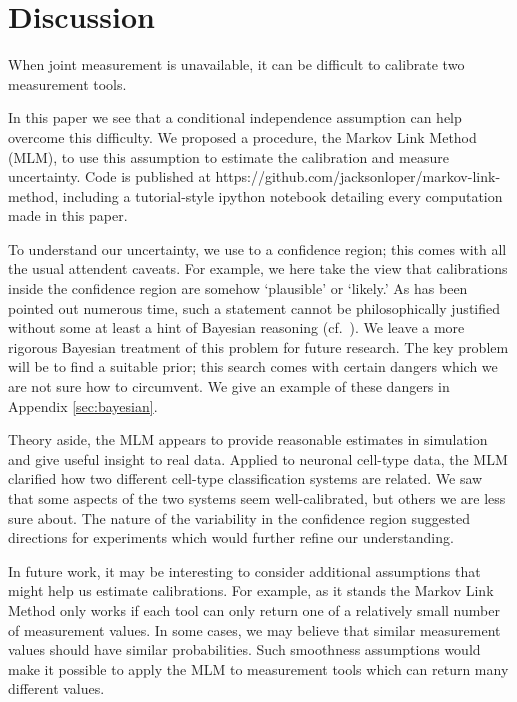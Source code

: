 %                                                    


\section{Discussion}

When joint measurement is unavailable, it can be difficult to calibrate two measurement tools.

In this paper we see that a conditional independence assumption can help overcome this difficulty.  We proposed a procedure, the Markov Link Method (MLM), to use this assumption to estimate the calibration and measure uncertainty.  Code is published at https://github.com/jacksonloper/markov-link-method, including a tutorial-style ipython notebook detailing every computation made in this paper.

To understand our uncertainty, we use to a confidence region; this comes with all the usual attendent caveats.  For example, we here take the view that calibrations inside the confidence region are somehow `plausible' or `likely.'  As has been pointed out numerous time, such a statement cannot be philosophically justified without some at least a hint of Bayesian reasoning (cf.\ \cite{morey2016fallacy}).    We leave a more rigorous Bayesian treatment of this problem for future research.  The key problem will be to find a suitable prior; this search comes with certain dangers which we are not sure how to circumvent.  We give an example of these dangers in Appendix \ref{sec:bayesian}.  

Theory aside, the MLM appears to provide reasonable estimates in simulation and give useful insight to real data.  Applied to neuronal cell-type data, the MLM clarified how two different cell-type classification systems are related.  We saw that some aspects of the two systems seem well-calibrated, but others we are less sure about.  The nature of the variability in the confidence region suggested directions for experiments which would further refine our understanding.  

In future work, it may be interesting to consider additional assumptions that might help us estimate calibrations.  For example, as it stands the Markov Link Method only works if each tool can only return one of a relatively small number of measurement values.  In some cases, we may believe that similar measurement values should have similar probabilities.  Such smoothness assumptions would make it possible to apply the MLM to measurement tools which can return many different values. 

